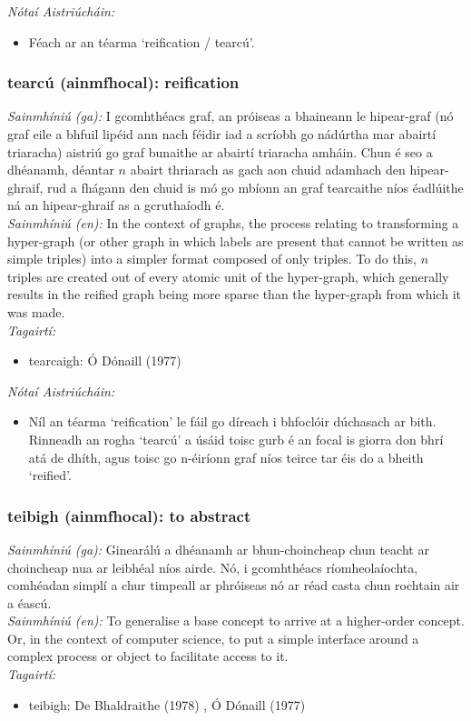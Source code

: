  \noindent \textit{Nótaí Aistriúcháin:}
\begin{itemize}
	\item Féach ar an téarma `reification / tearcú'.
\end{itemize}


\subsubsection*{tearcú (ainmfhocal): reification}
 \noindent \textit{Sainmhíniú (ga):} I gcomhthéacs graf, an próiseas a bhaineann le hipear-graf (nó graf eile a bhfuil lipéid ann nach féidir iad a scríobh go nádúrtha mar abairtí triaracha) aistriú go graf bunaithe ar abairtí triaracha amháin. Chun é seo a dhéanamh, déantar $n$ abairt thriarach as gach aon chuid adamhach den hipear-ghraif, rud a fhágann den chuid is mó go mbíonn an graf tearcaithe níos éadlúithe ná an hipear-ghraif as a gcruthaíodh é.
\\
 \noindent \textit{Sainmhíniú (en):} In the context of graphs, the process relating to transforming a hyper-graph (or other graph in which labels are present that cannot be written as simple triples) into a simpler format composed of only triples. To do this, $n$ triples are created out of every atomic unit of the hyper-graph, which generally results in the reified graph being more sparse than the hyper-graph from which it was made.
\\
 \noindent \textit{Tagairtí:}
\begin{itemize}
	\item tearcaigh: Ó Dónaill (1977) \cite{odonaill}
\end{itemize}

 \noindent \textit{Nótaí Aistriúcháin:}
\begin{itemize}
	\item Níl an téarma `reification' le fáil go díreach i bhfoclóir dúchasach ar bith. Rinneadh an rogha `tearcú' a úsáid toisc gurb é an focal is giorra don bhrí atá de dhíth, agus toisc go n-éiríonn graf níos teirce tar éis do a bheith `reified'.
\end{itemize}


\subsubsection*{teibigh (ainmfhocal): to abstract}
 \noindent \textit{Sainmhíniú (ga):} Ginearálú a dhéanamh ar bhun-choincheap chun teacht ar choincheap nua ar leibhéal níos airde. Nó, i gcomhthéacs ríomheolaíochta, comhéadan simplí a chur timpeall ar phróiseas nó ar réad casta chun rochtain air a éascú.
\\
 \noindent \textit{Sainmhíniú (en):} To generalise a base concept to arrive at a higher-order concept. Or, in the context of computer science, to put a simple interface around a complex process or object to facilitate access to it.
\\
 \noindent \textit{Tagairtí:}
\begin{itemize}
	\item teibigh: De Bhaldraithe (1978) \cite{de-bhaldraithe}, Ó Dónaill (1977) \cite{odonaill}
\end{itemize}

